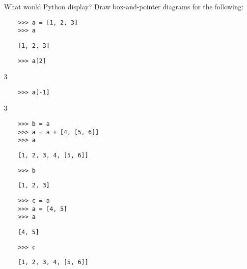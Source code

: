 \begin{blocksection}
    \question What would Python display? Draw box-and-pointer diagrams for the following:
    
    \begin{lstlisting}
    >>> a = [1, 2, 3]
    >>> a
    \end{lstlisting}
    \begin{solution}[.25in]
    \begin{lstlisting}
    [1, 2, 3]
    \end{lstlisting}
    \end{solution}
    
    \begin{lstlisting}
    >>> a[2]
    \end{lstlisting}
    \begin{solution}[.25in]
    3
    \end{solution}

    \begin{lstlisting}
    >>> a[-1]
    \end{lstlisting}
    \begin{solution}[.25in]
    3
    \end{solution}
    
    \begin{lstlisting}
    >>> b = a
    >>> a = a + [4, [5, 6]]
    >>> a
    \end{lstlisting}
    \begin{solution}[.25in]
    \begin{lstlisting}
    [1, 2, 3, 4, [5, 6]]
    \end{lstlisting}
    \end{solution}
    \begin{lstlisting}
    >>> b
    \end{lstlisting}
    \begin{solution}[.25in]
    \begin{lstlisting}
    [1, 2, 3]
    \end{lstlisting}
    \end{solution}
    
    \begin{lstlisting}
    >>> c = a
    >>> a = [4, 5]
    >>> a
    \end{lstlisting}
    \begin{solution}[.25in]
    \begin{lstlisting}
    [4, 5]
    \end{lstlisting}
    \end{solution}
    
    \begin{lstlisting}
    >>> c
    \end{lstlisting}
    \begin{solution}[.25in]
    \begin{lstlisting}
    [1, 2, 3, 4, [5, 6]]
    \end{lstlisting}
    \end{solution}
    \end{blocksection}
    
